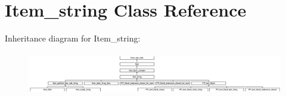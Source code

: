 \hypertarget{classItem__string}{}\section{Item\+\_\+string Class Reference}
\label{classItem__string}
Inheritance diagram for Item\+\_\+string\+:\begin{figure}[H]
\begin{center}
\leavevmode
\includegraphics[height=1.889764cm]{classItem__string}
\end{center}
\end{figure}
